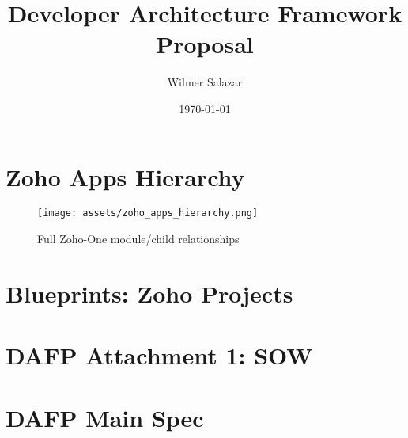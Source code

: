 \documentclass[11pt,a4paper]{scrartcl}
\title{Developer Architecture Framework Proposal}
\author{Wilmer Salazar}
\date{\today}
\begin{document}
\maketitle
\tableofcontents
\clearpage









\clearpage
\appendix

\section{Zoho Apps Hierarchy}
\begin{figure}[h]
  \centering
  \texttt{[image: assets/zoho\_apps\_hierarchy.png]}
  \caption{Full Zoho-One module/child relationships}
\end{figure}

\section{Blueprints: Zoho Projects}


\section{DAFP Attachment 1: SOW}


\section{DAFP Main Spec}

\end{document}
